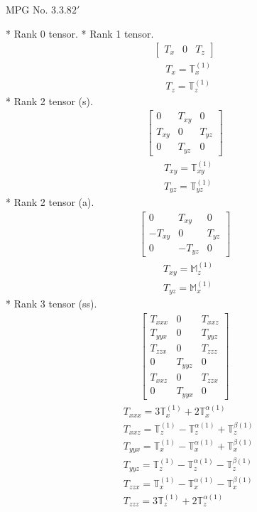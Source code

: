 \documentclass[fleqn,8pt,landscape]{jsarticle}
\begin{document}
\setcounter{MaxMatrixCols}{32}

\renewcommand{\tablename}{Table~}
\renewcommand{\figurename}{Figure~}
\begin{center}
\LARGE
MPG No. 3.3.8\quad$2'$
\end{center}
* Rank 0 tensor.
* Rank 1 tensor.
\begin{align*}
\begin{bmatrix} T_{x} & 0 & T_{z} \end{bmatrix}
\end{align*}
\begin{align*}
& T_{x} = \mathbb{T}_{x}^{(1)} \\
& T_{z} = \mathbb{T}_{z}^{(1)}
\end{align*}
* Rank 2 tensor (s).
\begin{align*}
\begin{bmatrix} 0 & T_{xy} & 0 \\ T_{xy} & 0 & T_{yz} \\ 0 & T_{yz} & 0 \end{bmatrix}
\end{align*}
\begin{align*}
& T_{xy} = \mathbb{T}_{xy}^{(1)} \\
& T_{yz} = \mathbb{T}_{yz}^{(1)}
\end{align*}
* Rank 2 tensor (a).
\begin{align*}
\begin{bmatrix} 0 & T_{xy} & 0 \\ - T_{xy} & 0 & T_{yz} \\ 0 & - T_{yz} & 0 \end{bmatrix}
\end{align*}
\begin{align*}
& T_{xy} = \mathbb{M}_{z}^{(1)} \\
& T_{yz} = \mathbb{M}_{x}^{(1)}
\end{align*}
* Rank 3 tensor (ss).
\begin{align*}
\begin{bmatrix} T_{xxx} & 0 & T_{xxz} \\ T_{yyx} & 0 & T_{yyz} \\ T_{zzx} & 0 & T_{zzz} \\ 0 & T_{yyz} & 0 \\ T_{xxz} & 0 & T_{zzx} \\ 0 & T_{yyx} & 0 \end{bmatrix}
\end{align*}
\begin{align*}
& T_{xxx} = 3 \mathbb{T}_{x}^{(1)} + 2 \mathbb{T}_{x}^{\alpha(1)} \\
& T_{xxz} = \mathbb{T}_{z}^{(1)} - \mathbb{T}_{z}^{\alpha(1)} + \mathbb{T}_{z}^{\beta(1)} \\
& T_{yyx} = \mathbb{T}_{x}^{(1)} - \mathbb{T}_{x}^{\alpha(1)} + \mathbb{T}_{x}^{\beta(1)} \\
& T_{yyz} = \mathbb{T}_{z}^{(1)} - \mathbb{T}_{z}^{\alpha(1)} - \mathbb{T}_{z}^{\beta(1)} \\
& T_{zzx} = \mathbb{T}_{x}^{(1)} - \mathbb{T}_{x}^{\alpha(1)} - \mathbb{T}_{x}^{\beta(1)} \\
& T_{zzz} = 3 \mathbb{T}_{z}^{(1)} + 2 \mathbb{T}_{z}^{\alpha(1)}
\end{align*}
\end{document}
